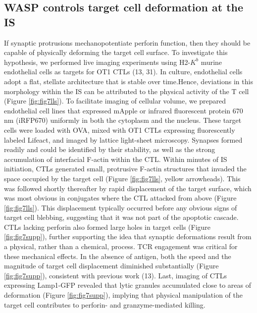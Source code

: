 \subsection{WASP controls target cell deformation at the IS}
If synaptic protrusions mechanopotentiate perforin function, then they should be capable of physically deforming the target cell surface. To investigate this hypothesis, we performed live imaging experiments using H2-$K^{b}$ murine endothelial cells as targets for OT1 CTLs (13, 31). In culture, endothelial cells adopt a flat, stellate architecture that is stable over time.Hence, deviations in this morphology within the IS can be attributed to the physical activity of the T cell (Figure \ref{fig:fig7lls}). To facilitate imaging of cellular volume, we prepared endothelial cell lines that expressed mApple or infrared fluorescent protein 670 nm (iRFP670) uniformly in both the cytoplasm and the nucleus. These target cells were loaded with OVA, mixed with OT1 CTLs expressing fluorescently labeled Lifeact, and imaged by lattice light-sheet microscopy. Synapses formed readily and could be identified by their stability, as well as the strong accumulation of interfacial F-actin within the CTL. Within minutes of IS initiation, CTLs generated small, protrusive F-actin structures that invaded the space occupied by the target cell (Figure \ref{fig:fig7lls}, yellow arrowheads). This was followed shortly thereafter by rapid displacement of the target surface, which was most obvious in conjugates where the CTL attacked from above (Figure \ref{fig:fig7lls}). This displacement typically occurred before any obvious signs of target cell blebbing, suggesting that it was not part of the apoptotic cascade. CTLs lacking perforin also formed large holes in target cells (Figure \ref{fig:fig7supp}), further supporting the idea that synaptic deformations result from a physical, rather than a chemical, process. TCR engagement was critical for these mechanical effects. In the absence of antigen, both the speed and the magnitude of target cell displacement diminished substantially (Figure \ref{fig:fig7supp}), consistent with previous work (13). Last, imaging of CTLs expressing Lamp1-GFP revealed that lytic granules accumulated close to areas of deformation (Figure \ref{fig:fig7supp}), implying that physical manipulation of the target cell contributes to perforin- and granzyme-mediated killing.


